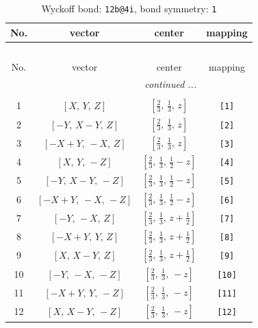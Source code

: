 \documentclass[fleqn,8pt]{jsarticle}
\begin{document}
\begin{longtable}{cccc}
\caption{Wyckoff bond: {\tt 12b@4i}, bond symmetry: {\tt 1}}
 \\
 \hline \hline
No. & vector & center & mapping \\ \hline \endfirsthead

\multicolumn{3}{l}{\tablename\ \thetable{}} \\
 \hline \hline
No. & vector & center & mapping \\ \hline \endhead

 \hline \hline
\multicolumn{3}{r}{\footnotesize\it continued ...} \\ \endfoot

 \hline \hline
\multicolumn{3}{r}{} \\ \endlastfoot

1 & $\left[ X,\, Y,\, Z \right]$ & $\left[ \frac{2}{3},\, \frac{1}{3},\, z \right]$ & {\tt [1]} \\ \hline
2 & $\left[ - Y,\, X - Y,\, Z \right]$ & $\left[ \frac{2}{3},\, \frac{1}{3},\, z \right]$ & {\tt [2]} \\ \hline
3 & $\left[ - X + Y,\, - X,\, Z \right]$ & $\left[ \frac{2}{3},\, \frac{1}{3},\, z \right]$ & {\tt [3]} \\ \hline
4 & $\left[ X,\, Y,\, - Z \right]$ & $\left[ \frac{2}{3},\, \frac{1}{3},\, \frac{1}{2} - z \right]$ & {\tt [4]} \\ \hline
5 & $\left[ - Y,\, X - Y,\, - Z \right]$ & $\left[ \frac{2}{3},\, \frac{1}{3},\, \frac{1}{2} - z \right]$ & {\tt [5]} \\ \hline
6 & $\left[ - X + Y,\, - X,\, - Z \right]$ & $\left[ \frac{2}{3},\, \frac{1}{3},\, \frac{1}{2} - z \right]$ & {\tt [6]} \\ \hline
7 & $\left[ - Y,\, - X,\, Z \right]$ & $\left[ \frac{2}{3},\, \frac{1}{3},\, z + \frac{1}{2} \right]$ & {\tt [7]} \\ \hline
8 & $\left[ - X + Y,\, Y,\, Z \right]$ & $\left[ \frac{2}{3},\, \frac{1}{3},\, z + \frac{1}{2} \right]$ & {\tt [8]} \\ \hline
9 & $\left[ X,\, X - Y,\, Z \right]$ & $\left[ \frac{2}{3},\, \frac{1}{3},\, z + \frac{1}{2} \right]$ & {\tt [9]} \\ \hline
10 & $\left[ - Y,\, - X,\, - Z \right]$ & $\left[ \frac{2}{3},\, \frac{1}{3},\, - z \right]$ & {\tt [10]} \\ \hline
11 & $\left[ - X + Y,\, Y,\, - Z \right]$ & $\left[ \frac{2}{3},\, \frac{1}{3},\, - z \right]$ & {\tt [11]} \\ \hline
12 & $\left[ X,\, X - Y,\, - Z \right]$ & $\left[ \frac{2}{3},\, \frac{1}{3},\, - z \right]$ & {\tt [12]} \\
\end{longtable}
\end{document}
